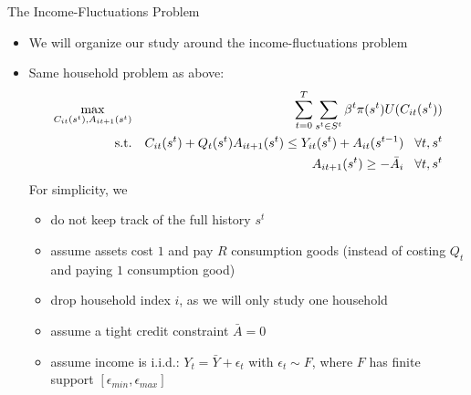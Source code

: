 \documentclass[9pt]{beamer}
\newcommand{\bit}{\begin{itemize}}
\newcommand{\eit}{\end{itemize}}
\newcommand{\bc}{\color{blue}}
\begin{document}
\begin{frame}{The Income-Fluctuations Problem}

\bit
\setlength\itemsep{1.5em}

\item We will organize our study around the {\bc income-fluctuations problem}

\item Same household problem as above:
\begin{eqnarray}
\max_{C_{it}(s^t), A_{it+1}(s^t)} && \sum_{t=0}^{T} \sum_{s^t \in S^t} \beta^t \pi (s^t) U(C_{it}(s^t)) \nonumber \\
\text{s.t.} && 	C_{it}(s^t) + Q_t(s^t) A_{it+1}(s^t)  \leq Y_{it}(s^t) + A_{it}(s^{t-1}) \hspace{3mm} \forall t, s^{t}\nonumber \\
&& A_{it+1}(s^t) \geq - \bar A_i \hspace{3mm} \forall t, s^{t}\nonumber
\end{eqnarray}
For simplicity, we
\bit
\setlength\itemsep{0.5em}
	\item do not keep track of the full history $s^t$
	
	\item assume assets cost $1$ and pay $R$ consumption goods (instead of costing $Q_t$ and paying $1$ consumption good)
	
	\item drop household index $i$, as we will only study one household 
	
	\item assume a tight credit constraint $\bar A = 0$
	
	\item assume income is i.i.d.: $Y_t = \bar Y + \epsilon_t$ with $\epsilon_t \sim F$, where $F$ has finite support $[\epsilon_{min}, \epsilon_{max}]$
\eit

\eit

\end{frame}
\end{document}
